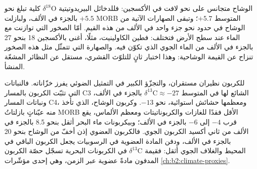 الوشاح متجانس على نحو لافت في الأكسجين: فللدخائل البيريدوتيتية
$\delta^{18}\mathrm{O}$ كلية تبلغ نحو $+5.5$ بالجزء في الألف، ولبازلت MORB المتوسط $+5.7$؛ وتبقى الصهارات
الآتية من الوشاح في حدود نحو جزء واحد في الألف من هذه القيم. أمّا الصخور التي
توازنت مع الماء عند سطح الأرض فتختلف: فطين الكاولينيت،
مثلًا، أغنى بالأكسجين 18 بنحو 27 بالجزء في الألف من الماء الجوي الذي
تكوّن فيه. والصهارة التي تتمثّل مثل هذه الصخور تنزاح عن القيمة
الوشاحية: وهذا اختبار ثانٍ للتلوّث القشري، مستقل عن النظائر
المشعّة المنشأ.

للكربون نظيران مستقران، والتجزّؤ الكبير في التمثيل الضوئي
يفرز خزّاناته. فالنباتات التي تثبّت الكربون بالمسار C3 الشائع لها في المتوسط
$\delta^{13}\mathrm{C} \approx -27$ بالجزء في الألف، ونباتات المسار C4، ومعظمها حشائش
استوائية، نحو $-13$. وكربون الوشاح، الذي تأخذ منه عيّناتٍ بازلتاتُ MORB الأقل فقدًا للغازات
والكربوناتيتات ومعظم الألماس، يقع قرب $-4$ إلى $-6$ بالجزء في الألف؛
وبيكربونات ماء البحر أثقل بنحو 8.5 بالجزء في الألف من ثاني أكسيد الكربون
الجوي. فالكربون العضوي إذن أخفّ من الوشاح بنحو 20 بالجزء في الألف،
ودفن المادة العضوية في الرسوبيات يجعل الكربون الباقي في
المحيط والغلاف الجوي أثقل: فقيمة $\delta^{13}\mathrm{C}$ في الكربونات البحرية
تسجّل حصّة الكربون المدفون مادةً عضوية عبر الزمن، وهي إحدى
مؤشّرات \cref{ch:b2:climate-proxies}.

\begin{omfigure}
\centering
{}
\par{}
\end{omfigure}

